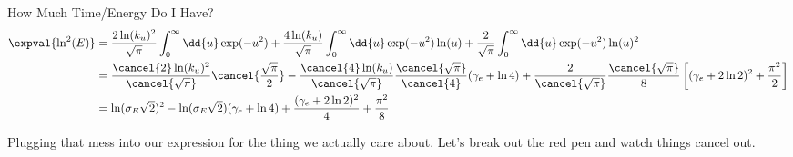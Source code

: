 \begin{answer}
\begin{answerpart}{How Much Time/Energy Do I Have?}
    \begin{equation}
      \begin{alignedat}{2}
        &&\expval{\ln^2(E)}
        &=
        \frac{2\ln(k_u)^2}{\sqrt{\pi}}
        \int_0^\infty
        \dd{u}
        \exp(-u^2)
        +
        \frac{4\ln(k_u)}{\sqrt{\pi}}
        \int_0^\infty
        \dd{u}
        \exp(-u^2)
        \ln(u)
        +
        \frac{2}{\sqrt{\pi}}
        \int_0^\infty
        \dd{u}
        \exp(-u^2)
        \ln(u)^2
        \\
        &&&=
        \frac{\cancel{2}\ln(k_u)^2}{\cancel{\sqrt{\pi}}}
        \cancel{\frac{\sqrt{\pi}}{2}}
        -
        \frac{\cancel{4}\ln(k_u)}{\cancel{\sqrt{\pi}}}
        \frac{\cancel{\sqrt{\pi}}}{\cancel{4}}(\gamma_e + \ln 4)
        +
        \frac{2}{\cancel{\sqrt{\pi}}}
        \frac{\cancel{\sqrt{\pi}}}{8}
        \left[
        (\gamma_e + 2\ln 2)^2
          + \frac{\pi^2}{2}
          \right]
        \\
        &&&=
        \ln(\sigma_E\sqrt{2})^2
        -
        \ln(\sigma_E\sqrt{2})
        (\gamma_e + \ln 4)
        +
        \frac{(\gamma_e + 2\ln 2)^2}{4}
        +
        \frac{\pi^2}{8}
        \\
      \end{alignedat}
    \end{equation}

    Plugging that mess into our expression for the thing we actually
    care about.  Let's break out the red pen and watch things cancel
    out.


\end{answerpart}
\end{answer}
